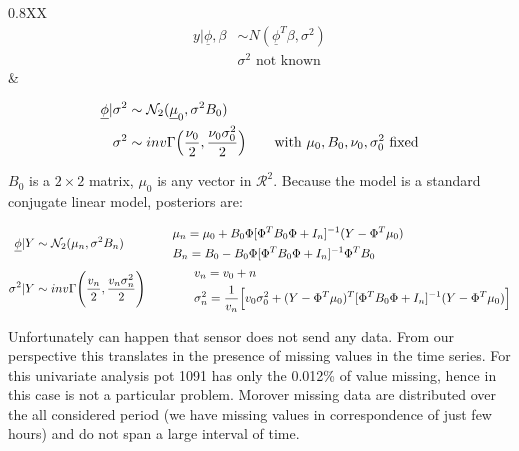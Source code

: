 \documentclass{article}
\begin{document}
\vspace{3mm}

\begin{tabularx}{0.8\textwidth}{XX}
    { 
        \newline\newline
        \[
        \begin{aligned} 
        y|\underline{\phi},\beta & \sim N(\underline{\phi}^{T}\beta,\sigma^{2})\\
        & \text{$\sigma^{2}$ not known}
        \end{aligned}
        \]
    }&{
        \newline\newline
        \[
        \begin{aligned}
	    \underline{\phi }|\sigma^2 &\sim \mathcal{N}_2(\underline\mu_0, \sigma^2B_0) \\
        \sigma^2 &\sim inv\Gamma \Bigl(\frac{\nu_0}{2}, \frac{\nu_0 \sigma_0^2}{2} \Bigr) \qquad
        \text{with $\mu_0, B_0, \nu_0, \sigma_0^2$ fixed}
        \end{aligned}
        \]
	
    }
\end{tabularx}

\vspace{3mm}

$B_0$ is a $2 \times 2$ matrix, $\mu_0$ is any vector in $\mathcal{R}^2$. Because the model is a standard conjugate linear model, posteriors are:

\newline\newline
\[
\begin{aligned}
\underline{\phi} | Y &\sim \mathcal{N}_2 (\mu_n, \sigma^2 B_n)
\qquad \qquad
\begin{aligned}
    & \mu_n = \mu_0 + B_0 \Phi[\Phi^{T} B_0 \Phi + I_n]^{-1}(Y - \Phi^T\mu_0) \\
    & B_n = B_0 - B_0\Phi[\Phi^{T} B_0 \Phi + I_n]^{-1}\Phi^T B_0 \\
\end{aligned} \\
\sigma^2 | Y &\sim inv\Gamma \Biggl(\frac{v_n}{2}, \frac{v_n \sigma_n^2}{2} \Biggr) 
\qquad \qquad 
\begin{aligned}
    & v_n = v_0 + n \\
    & \sigma_n^2 = \frac{1}{v_n} \Bigl[ v_0\sigma_0^2 + (Y - \Phi^T\mu_0)^T [\Phi^T B_0 \Phi + I_n]^{-1} (Y - \Phi^T\mu_0) \Bigr]
    \end{aligned}\\
\end{aligned}
\]
\vspace{10mm}

Unfortunately can happen that sensor does not send any data. From our perspective this translates in the presence of missing values in the time series. For this univariate analysis pot 1091 has only the 0.012\% of value missing, hence in this case is not a particular problem. Morover missing data are distributed over the all considered period (we have missing values in correspondence of just few hours) and do not span a large interval of time.
\end{document}
